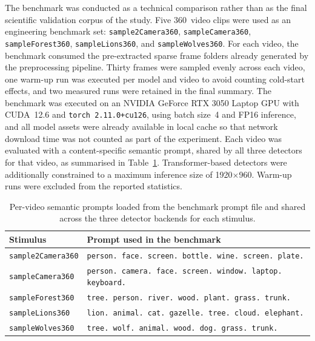\documentclass[11pt]{article}
\begin{document}
The benchmark was conducted as a technical comparison rather than as the final scientific validation corpus of the study. Five 360\textdegree\ video clips were used as an engineering benchmark set: \texttt{sample2Camera360}, \texttt{sampleCamera360}, \texttt{sampleForest360}, \texttt{sampleLions360}, and \texttt{sampleWolves360}. For each video, the benchmark consumed the pre-extracted sparse frame folders already generated by the preprocessing pipeline. Thirty frames were sampled evenly across each video, one warm-up run was executed per model and video to avoid counting cold-start effects, and two measured runs were retained in the final summary. The benchmark was executed on an NVIDIA GeForce RTX 3050 Laptop GPU with CUDA~12.6 and \texttt{torch 2.11.0+cu126}, using batch size~4 and FP16 inference, and all model assets were already available in local cache so that network download time was not counted as part of the experiment. Each video was evaluated with a content-specific semantic prompt, shared by all three detectors for that video, as summarised in Table~\ref{tab:detector-benchmark-prompts}. Transformer-based detectors were additionally constrained to a maximum inference size of 1920$\times$960. Warm-up runs were excluded from the reported statistics.

\begin{table}[htbp]
    \centering
    \scriptsize
    \begin{tabular}{lp{}}
        \toprule
        Stimulus & Prompt used in the benchmark \\
        \midrule
        \texttt{sample2Camera360} & \texttt{person. face. screen. bottle. wine. screen. plate.} \\
        \texttt{sampleCamera360} & \texttt{person. camera. face. screen. window. laptop. keyboard.} \\
        \texttt{sampleForest360} & \texttt{tree. person. river. wood. plant. grass. trunk.} \\
        \texttt{sampleLions360} & \texttt{lion. animal. cat. gazelle. tree. cloud. elephant.} \\
        \texttt{sampleWolves360} & \texttt{tree. wolf. animal. wood. dog. grass. trunk.} \\
        \bottomrule
    \end{tabular}
    \caption{Per-video semantic prompts loaded from the benchmark prompt file and shared across the three detector backends for each stimulus.}
    \label{tab:detector-benchmark-prompts}
\end{table}
\end{document}
